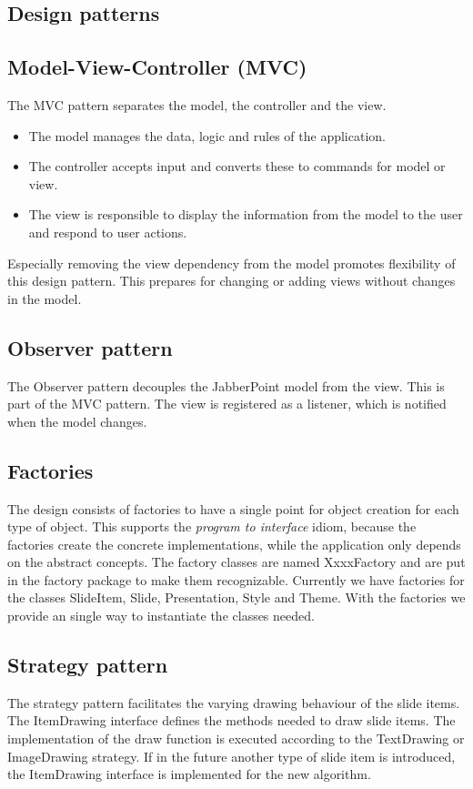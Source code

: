 \documentclass[a4paper]{article}
\begin{document}
\subsection{Design patterns}
\subsection{Model-View-Controller (MVC)}
The MVC pattern separates the model, the controller and the view.   
\begin{itemize}
\item The model manages the data, logic and rules of the application.
\item The controller accepts input and converts these to commands for model or view.
\item The view is responsible to display the information from the model to the user and respond to user actions.   
\end{itemize}
Especially removing the view dependency from the model promotes flexibility of this design pattern. This prepares for changing or adding views without changes in the model.

\subsection{Observer pattern}
The Observer pattern decouples the JabberPoint model from the view. This is part of the MVC pattern. The view is registered as a listener, which is notified when the model changes.

\subsection{Factories}
The design consists of factories to have a single point for object creation for each type of object. This supports the \textit{program to interface} idiom, because the factories create the concrete implementations, while the application only depends on the abstract concepts. The factory classes are named XxxxFactory and are put in the factory package to make them recognizable.
Currently we have factories for the classes SlideItem, Slide, Presentation, Style and Theme. With the factories we provide an single way to instantiate the classes needed.

\subsection{Strategy pattern}
The strategy pattern facilitates the varying drawing behaviour of the slide items. The ItemDrawing interface defines the methods needed to draw slide items. The implementation of the draw function is executed according to the TextDrawing or ImageDrawing strategy. If  in the future another type of slide item is introduced, the ItemDrawing interface is implemented for the new algorithm.
\end{document}
